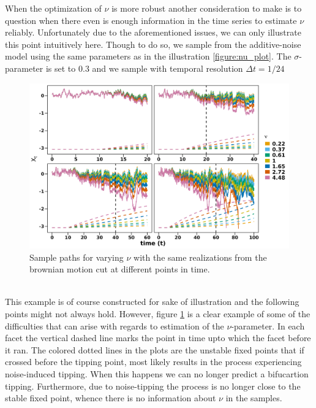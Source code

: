 When the optimization of $\nu$ is more robust another consideration to make is to question when there even is enough information in the time series to estimate $\nu$ reliably. Unfortunately due to the aforementioned issues, we can only illustrate this point intuitively here. Though to do so, we sample from the additive-noise model using the same parameters as in the illustration \ref{figure:nu_plot}. The $\sigma$-parameter is set to $0.3$ and we sample with temporal resolution $\Delta t = 1/24$
\begin{figure}[h!]
    \begin{center}
    \includegraphics[scale = .13]{figures/mu_simulations_discussion_plot.jpeg}
    \caption{Sample paths for varying $\nu$ with the same realizations from the brownian motion cut at different points in time.}
    \label{figure:mu_simulations_discussion_plot}
    \end{center}
\end{figure}\\
This example is of course constructed for sake of illustration and the following points might not always hold. However, figure \ref{figure:mu_simulations_discussion_plot} is a clear example of some of the difficulties that can arise with regards to estimation of the $\nu$-parameter. In each facet the vertical dashed line marks the point in time upto which the facet before it ran. The colored dotted lines in the plots are the unstable fixed points that if crossed before the tipping point, most likely results in the process experiencing noise-induced tipping. When this happens we can no longer predict a bifucartion tipping. Furthermore, due to noise-tipping the process is no longer close to the stable fixed point, whence there is no information about $\nu$ in the samples.

